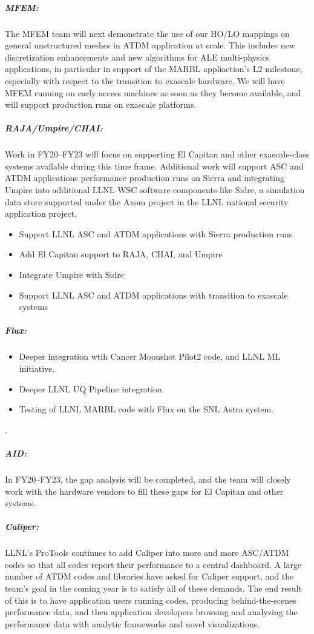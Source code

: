 \subparagraph{MFEM:}
The MFEM team will next demonstrate the use of our HO/LO mappings on
general unstructured meshes in ATDM application at scale.  This includes
new discretization enhancements and new algorithms for ALE multi-physics
applications, in particular in support of the MARBL appliaction's L2
milestone, especially with respect to the transition to exascale
hardware.  We will have MFEM running on early access machines as soon as
they become available, and will support production runs on exascale platforms.

\subparagraph{RAJA/Umpire/CHAI:}

Work in FY20–FY23 will focus on supporting El Capitan and other
exascale-class systems available during this time frame. Additional work
will support ASC and ATDM applications performance production runs on
Sierra and integrating Umpire into additional LLNL WSC software
components like Sidre, a simulation data store supported under the Axom
project in the LLNL national security application project.

\begin{itemize}
\item Support LLNL ASC and ATDM applications with Sierra production runs
\item Add El Capitan support to RAJA, CHAI, and Umpire
\item Integrate Umpire with Sidre
\item Support LLNL ASC and ATDM applications with transition to exascale
      systems
\end{itemize}

\subparagraph{Flux:}

\begin{itemize}
\item Deeper integration wtih Cancer Moonshot Pilot2 code, and LLNL ML initiative.
\item Deeper LLNL UQ Pipeline integration.
\item Testing of LLNL MARBL code with Flux on the SNL Astra system.
\end{itemize}
.

\subparagraph{AID:}
In FY20–FY23, the gap analysis will be completed, and the team will
closely work with the hardware vendors to fill these gaps for El Capitan
and other systems.

\subparagraph{Caliper:}
LLNL's ProTools continues to add Caliper into more and more ASC/ATDM
codes so that all codes report their performance to a central dashboard.
A large number of ATDM codes and libraries have asked for Caliper
support, and the team's goal in the coming year is to satisfy all of
these demands.  The end result of this is to have application users
running codes, producing behind-the-scenes performance data, and then
application developers browsing and analyzing the performance data with
analytic frameworks and novel visualizations.
